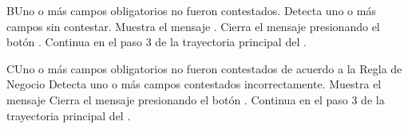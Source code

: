 \begin{UCtrayectoriaA}{B}{Uno o más campos obligatorios no fueron contestados.}
\UCpaso Detecta uno o más campos sin contestar.
\UCpaso Muestra el mensaje .
\UCpaso[\UCactor] Cierra el mensaje presionando el botón .
\UCpaso Continua en el paso 3 de la trayectoria principal del .
\end{UCtrayectoriaA}


\begin{UCtrayectoriaA}{C}{Uno o más campos obligatorios no fueron contestados de acuerdo a la Regla de Negocio \UCBussinesRule{}{}}
\UCpaso Detecta uno o más campos contestados incorrectamente.
\UCpaso Muestra el mensaje 
\UCpaso[\UCactor] Cierra el mensaje presionando el botón .
\UCpaso Continua en el paso 3 de la trayectoria principal del .
\end{UCtrayectoriaA}